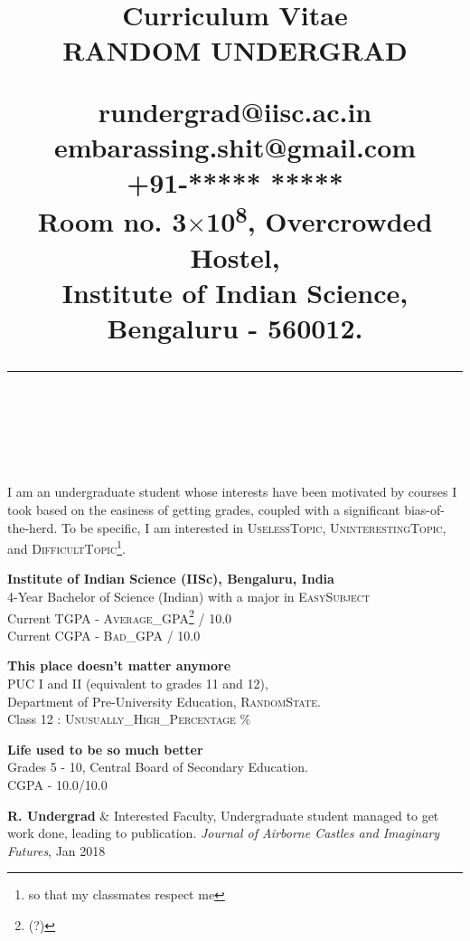 \documentclass{article}
\title{
	\vspace{-1cm}
	\Large{Curriculum Vitae\\[3mm]}
	\Huge{RANDOM UNDERGRAD\\[3mm]}
	\begin{multicols}{2}
	\small{rundergrad@iisc.ac.in\\}
	\small{embarassing.shit@gmail.com\\}
	\small{+91-***** ***** \\[3mm]}
	\small{
		Room no. 3$\times$10\textsuperscript{8}, Overcrowded Hostel, \\
		Institute of Indian Science, \\
		Bengaluru - 560012. \\
	}
	\end{multicols}
	\vspace{-1cm}
	\rule{100mm}{0.25mm} \\[5mm]
}
\date{}
\author{}
\begin{document}
\maketitle
\vspace{-1.5cm}
\begin{addmargin}[0.75in]{0.75in}
	\reversemarginpar
	I am an undergraduate student whose interests have been motivated by courses I took based on the easiness of getting grades, coupled with a significant bias-of-the-herd. To be specific, I am interested in \textsc{UselessTopic, UninterestingTopic}, and \textsc{DifficultTopic}\footnote{so that my classmates respect me}.\\
\end{addmargin}
\begin{addmargin}[0.75in]{0.75in}
	\reversemarginpar
	\noindent
	\textbf{Institute of Indian Science (IISc), Bengaluru, India\\} \normalmarginpar {}
	4-Year Bachelor of Science (Indian) with a major in \textsc{EasySubject}\\
	Current TGPA - \textsc{Average\_GPA\footnote{(?)}} / 10.0\\
	Current CGPA - \textsc{Bad\_GPA} / 10.0

	\noindent
	\textbf{This place doesn't matter anymore\\} \normalmarginpar {}
	PUC I and II (equivalent to grades 11 and 12),\\ Department of Pre-University Education, \textsc{RandomState}.\\
	Class 12 : \textsc{Unusually\_High\_Percentage} \%
	
	\noindent
	\textbf{Life used to be so much better\\} \normalmarginpar {}
	Grades 5 - 10, Central Board of Secondary Education.\\
	CGPA - 10.0/10.0\\	
\end{addmargin}
\begin{addmargin}[0.75in]{0.75in}
	\reversemarginpar{}
	\noindent
	\textbf{R. Undergrad} \& Interested Faculty, Undergraduate student managed to get work done, leading to publication. \emph{Journal of Airborne Castles and Imaginary Futures}, Jan 2018\\
\end{addmargin}
\end{document}
